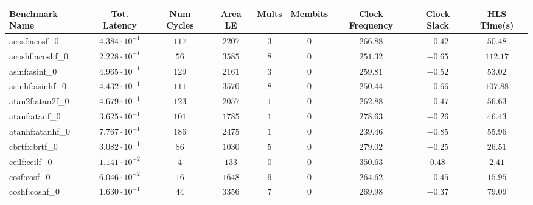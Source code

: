\begin{tabular}{|l|c|c|c|c|c|c|c|c|}
\hline
Benchmark Name               & Tot. Latency            & Num Cycles & Area LE   & Mults   & Membits & Clock Frequency & Clock Slack & HLS Time(s) \\
\hline
acosf:acosf\_0               & $ 4.384 \cdot 10^{-1} $ & $ 117    $ & $ 2207  $ & $ 3   $ & $ 0   $ & $ 266.88      $ & $ -0.42   $ & $ 50.48   $ \\
acoshf:acoshf\_0             & $ 2.228 \cdot 10^{-1} $ & $ 56     $ & $ 3585  $ & $ 8   $ & $ 0   $ & $ 251.32      $ & $ -0.65   $ & $ 112.17  $ \\
asinf:asinf\_0               & $ 4.965 \cdot 10^{-1} $ & $ 129    $ & $ 2161  $ & $ 3   $ & $ 0   $ & $ 259.81      $ & $ -0.52   $ & $ 53.02   $ \\
asinhf:asinhf\_0             & $ 4.432 \cdot 10^{-1} $ & $ 111    $ & $ 3570  $ & $ 8   $ & $ 0   $ & $ 250.44      $ & $ -0.66   $ & $ 107.88  $ \\
atan2f:atan2f\_0             & $ 4.679 \cdot 10^{-1} $ & $ 123    $ & $ 2057  $ & $ 1   $ & $ 0   $ & $ 262.88      $ & $ -0.47   $ & $ 56.63   $ \\
atanf:atanf\_0               & $ 3.625 \cdot 10^{-1} $ & $ 101    $ & $ 1785  $ & $ 1   $ & $ 0   $ & $ 278.63      $ & $ -0.26   $ & $ 46.43   $ \\
atanhf:atanhf\_0             & $ 7.767 \cdot 10^{-1} $ & $ 186    $ & $ 2475  $ & $ 1   $ & $ 0   $ & $ 239.46      $ & $ -0.85   $ & $ 55.96   $ \\
cbrtf:cbrtf\_0               & $ 3.082 \cdot 10^{-1} $ & $ 86     $ & $ 1030  $ & $ 5   $ & $ 0   $ & $ 279.02      $ & $ -0.25   $ & $ 26.51   $ \\
ceilf:ceilf\_0               & $ 1.141 \cdot 10^{-2} $ & $ 4      $ & $ 133   $ & $ 0   $ & $ 0   $ & $ 350.63      $ & $ 0.48    $ & $ 2.41    $ \\
cosf:cosf\_0                 & $ 6.046 \cdot 10^{-2} $ & $ 16     $ & $ 1648  $ & $ 9   $ & $ 0   $ & $ 264.62      $ & $ -0.45   $ & $ 15.95   $ \\
coshf:coshf\_0               & $ 1.630 \cdot 10^{-1} $ & $ 44     $ & $ 3356  $ & $ 7   $ & $ 0   $ & $ 269.98      $ & $ -0.37   $ & $ 79.09   $ \\

\end{tabular}
